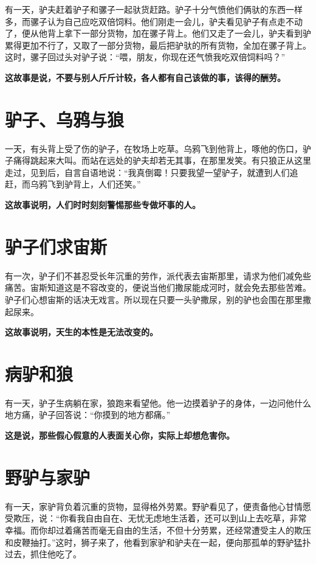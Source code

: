 有一天，驴夫赶着驴子和骡子一起驮货赶路。驴子十分气愤他们俩驮的东西一样多，而骡子认为自己应吃双倍饲料。他们刚走一会儿，驴夫看见驴子有点走不动了，便从他背上拿下一部分货物，加在骡子背上。他们又走了一会儿，驴夫看到驴累得更加不行了，又取了一部分货物，最后把驴驮的所有货物，全加在骡子背上。这时，骡子回过头对驴子说：“喂，朋友，你现在还气愤我吃双倍饲料吗？”

{\bfseries \color{red}这故事是说，不要与别人斤斤计较，各人都有自己该做的事，该得的酬劳。}

\section{驴子、乌鸦与狼}

一天，有头背上受了伤的驴子，在牧场上吃草。乌鸦飞到他背上，啄他的伤口，驴子痛得跳起来大叫。而站在远处的驴夫却若无其事，在那里发笑。有只狼正从这里走过，见到后，自言自语地说：“我真倒霉！只要我望一望驴子，就遭到人们追赶，而乌鸦飞到驴背上，人们还笑。”

{\bfseries \color{red}这故事说明，人们时时刻刻警惕那些专做坏事的人。}

\section{驴子们求宙斯}

有一次，驴子们不甚忍受长年沉重的劳作，派代表去宙斯那里，请求为他们减免些痛苦。宙斯知道这是不容改变的，便说当他们撒尿能成河时，就会免去那些苦难。驴子们心想宙斯的话决无戏言。所以现在只要一头驴撒尿，别的驴也会围在那里撒起尿来。

{\bfseries \color{red}这故事说明，天生的本性是无法改变的。}

\section{病驴和狼}

有一天，驴子生病躺在家，狼跑来看望他。他一边摸着驴子的身体，一边问他什么地方痛，驴子回答说：“你摸到的地方都痛。”

{\bfseries \color{red}这是说，那些假心假意的人表面关心你，实际上却想危害你。}

\section{野驴与家驴}

有一天，家驴背负着沉重的货物，显得格外劳累。野驴看见了，便责备他心甘情愿受欺压，说：“你看我自由自在、无忧无虑地生活着，还可以到山上去吃草，非常幸福。而你却过着痛苦而毫无自由的生活，不但十分劳累，还经常遭受主人的欺压和皮鞭抽打。”这时，狮子来了，他看到家驴和驴夫在一起，便向那孤单的野驴猛扑过去，抓住他吃了。

